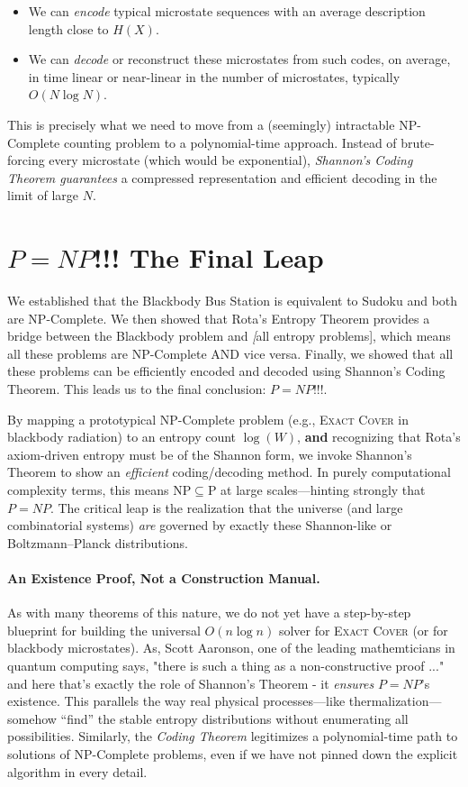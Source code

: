\documentclass{report}
\begin{document}
\begin{itemize}
\item We can \emph{encode} typical microstate sequences with an average description length close to \(H(X)\).  
\item We can \emph{decode} or reconstruct these microstates from such codes, on average, in time linear or near-linear in the number of microstates, typically \(O(N\log N)\).  
\end{itemize}

\noindent
This is precisely what we need to move from a (seemingly) intractable NP-Complete counting problem to a polynomial-time approach. Instead of brute-forcing every microstate (which would be exponential), \emph{Shannon’s Coding Theorem guarantees} a compressed representation and efficient decoding in the limit of large \(N\).


\section*{\texorpdfstring{$P=NP$}{P=NP}!!! The Final Leap}
We established that the Blackbody Bus Station is equivalent to Sudoku and both are NP-Complete. We then showed that Rota’s Entropy Theorem provides a bridge between the Blackbody problem and \emph[all entropy problems], which means all these problems are NP-Complete AND vice versa. Finally, we showed that all these problems can be efficiently encoded and decoded using Shannon’s Coding Theorem. This leads us to the final conclusion: \(\boxed{P = NP}\)!!!.

By mapping a prototypical NP-Complete problem (e.g., \textsc{Exact Cover} in blackbody radiation) to an entropy count \(\log(W)\), \textbf{and} recognizing that Rota’s axiom-driven entropy must be of the Shannon form, we invoke Shannon’s Theorem to show an \emph{efficient} coding/decoding method. In purely computational complexity terms, this means \(\mathrm{NP} \subseteq \mathrm{P}\) at large scales—hinting strongly that \(P=NP\). The critical leap is the realization that the universe (and large combinatorial systems) \emph{are} governed by exactly these Shannon-like or Boltzmann--Planck distributions.

\paragraph{An Existence Proof, Not a Construction Manual.}  
As with many theorems of this nature, we do not yet have a step-by-step blueprint for building the universal \(O(n \log n)\) solver for \textsc{Exact Cover} (or for blackbody microstates). As, Scott Aaronson, one of the leading mathemticians in quantum computing says, "there is such a thing as a non-constructive proof ..."\cite{aaronson2021prove} and here that's exactly the role of Shannon’s Theorem - it \emph{ensures} \(P=NP\)'s existence. This parallels the way real physical processes—like thermalization—somehow “find” the stable entropy distributions without enumerating all possibilities. Similarly, the \emph{Coding Theorem} legitimizes a polynomial-time path to solutions of NP-Complete problems, even if we have not pinned down the explicit algorithm in every detail.
\end{document}
